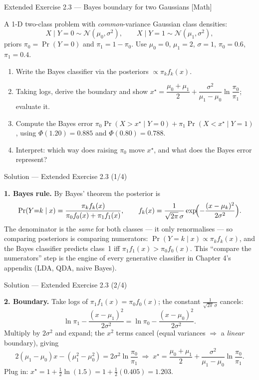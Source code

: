 \documentclass[aspectratio=169,11pt]{beamer}
\begin{document}
\begin{frame}{Extended Exercise 2.3 --- Bayes boundary for two Gaussians [Math]}
\begin{longexercise}
A 1-D two-class problem with \emph{common}-variance Gaussian class densities:
\[
X\mid Y{=}0\sim\mathcal N(\mu_0,\sigma^2),\qquad X\mid Y{=}1\sim\mathcal N(\mu_1,\sigma^2),
\]
priors $\pi_0=\Pr(Y{=}0)$ and $\pi_1=1-\pi_0$. Use $\mu_0=0$, $\mu_1=2$, $\sigma=1$, $\pi_0=0.6$, $\pi_1=0.4$.
\begin{enumerate}\setlength\itemsep{1pt}
  \item Write the Bayes classifier via the posteriors $\propto\pi_k f_k(x)$.
  \item Taking logs, derive the boundary and show $x^\star=\dfrac{\mu_0+\mu_1}{2}+\dfrac{\sigma^2}{\mu_1-\mu_0}\ln\dfrac{\pi_0}{\pi_1}$; evaluate it.
  \item Compute the Bayes error $\pi_0\Pr(X{>}x^\star\mid Y{=}0)+\pi_1\Pr(X{<}x^\star\mid Y{=}1)$, using $\Phi(1.20)=0.885$ and $\Phi(0.80)=0.788$.
  \item Interpret: which way does raising $\pi_0$ move $x^\star$, and what does the Bayes error represent?
\end{enumerate}
\end{longexercise}
\end{frame}

\begin{frame}{Solution --- Extended Exercise 2.3 (1/4)}
\begin{solutionbox}
\textbf{1. Bayes rule.} By Bayes' theorem the posterior is
\[
  \Pr(Y{=}k\mid x)
  = \frac{\pi_k f_k(x)}{\pi_0 f_0(x) + \pi_1 f_1(x)},
  \qquad
  f_k(x)=\frac{1}{\sqrt{2\pi}\,\sigma}
         \exp\!\Bigl(-\frac{(x-\mu_k)^2}{2\sigma^2}\Bigr).
\]
The denominator is the \emph{same} for both classes --- it only renormalises
--- so comparing posteriors is comparing numerators:
$\Pr(Y{=}k\mid x)\propto\pi_k f_k(x)$, and the Bayes classifier predicts
class~1 iff $\pi_1 f_1(x)>\pi_0 f_0(x)$. This ``compare the numerators''
step is the engine of every generative classifier in Chapter 4's appendix
(LDA, QDA, naive Bayes).
\end{solutionbox}
\end{frame}

\begin{frame}{Solution --- Extended Exercise 2.3 (2/4)}
\begin{solutionbox}
\textbf{2. Boundary.} Take logs of $\pi_1 f_1(x)=\pi_0 f_0(x)$; the constant $\frac{1}{\sqrt{2\pi}\,\sigma}$ cancels:
\[
\ln\pi_1-\frac{(x-\mu_1)^2}{2\sigma^2}=\ln\pi_0-\frac{(x-\mu_0)^2}{2\sigma^2}.
\]
Multiply by $2\sigma^2$ and expand; the $x^2$ terms cancel (equal variances $\Rightarrow$ a \emph{linear} boundary), giving
\[
2(\mu_1-\mu_0)x-(\mu_1^2-\mu_0^2)=2\sigma^2\ln\frac{\pi_0}{\pi_1}
\;\Rightarrow\;
x^\star=\frac{\mu_0+\mu_1}{2}+\frac{\sigma^2}{\mu_1-\mu_0}\ln\frac{\pi_0}{\pi_1}.
\]
Plug in: $x^\star=1+\tfrac12\ln(1.5)=1+\tfrac12(0.405)=\mathbf{1.203}$.
\end{solutionbox}
\end{frame}
\end{document}
